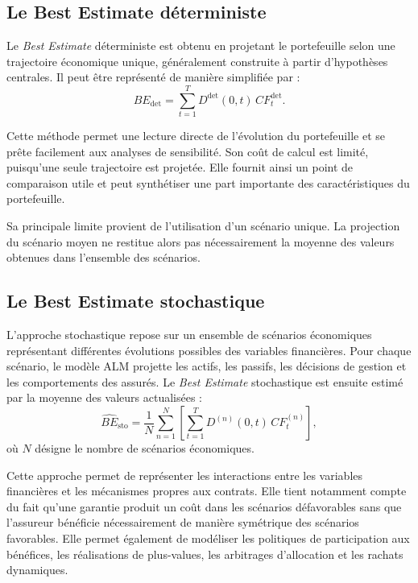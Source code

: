 \subsection{Le Best Estimate déterministe}

Le \textit{Best Estimate} déterministe est obtenu en projetant le portefeuille
selon une trajectoire économique unique, généralement construite à partir
d'hypothèses centrales. Il peut être représenté de manière simplifiée par :
\[
    BE_{\mathrm{det}}
    =
    \sum_{t=1}^{T}
    D^{\mathrm{det}}(0,t)\,
    CF_t^{\mathrm{det}}.
\]

Cette méthode permet une lecture directe de l'évolution du portefeuille et se
prête facilement aux analyses de sensibilité. Son coût de calcul est limité,
puisqu'une seule trajectoire est projetée. Elle fournit ainsi un point de
comparaison utile et peut synthétiser une part importante des caractéristiques
du portefeuille.

Sa principale limite provient de l'utilisation d'un scénario unique. 
La projection du scénario moyen ne restitue alors pas nécessairement la
moyenne des valeurs obtenues dans l'ensemble des scénarios. 

\subsection{Le Best Estimate stochastique}

L'approche stochastique repose sur un ensemble de scénarios économiques
représentant différentes évolutions possibles des variables financières. Pour
chaque scénario, le modèle ALM projette les actifs, les passifs, les décisions
de gestion et les comportements des assurés. Le \textit{Best Estimate}
stochastique est ensuite estimé par la moyenne des valeurs actualisées :
\[
    \widehat{BE}_{\mathrm{sto}}
    =
    \frac{1}{N}
    \sum_{n=1}^{N}
    \left[
        \sum_{t=1}^{T}
        D^{(n)}(0,t)\,
        CF_t^{(n)}
    \right],
\]
où \(N\) désigne le nombre de scénarios économiques.

Cette approche permet de représenter les interactions entre les variables
financières et les mécanismes propres aux contrats. Elle tient notamment compte
du fait qu'une garantie produit un coût dans les scénarios défavorables sans
que l'assureur bénéficie nécessairement de manière symétrique des scénarios
favorables. Elle permet également de modéliser les politiques de participation
aux bénéfices, les réalisations de plus-values, les arbitrages d'allocation et
les rachats dynamiques.

